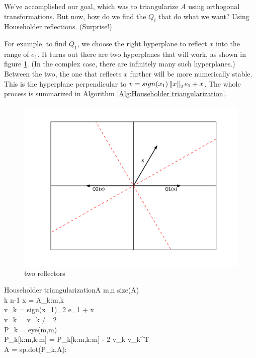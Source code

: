 We've accomplished our goal, which was to triangularize $A$ using orthogonal transformations. 
But now, how do we find the $Q_i$ that do what we want? Using Householder reflections. (Surprise!)

For example, to find $Q_1$, we choose the right hyperplane to reflect $x$ into the range of $e_1$.
It turns out there are two hyperplanes that will work, as shown in figure \ref{fig:two reflectors}. 
(In the complex case, there are infinitely many such hyperplanes.) 
Between the two, the one that reflects $x$ further will be more numerically stable. 
This is the hyperplane perpendicular to \textbf{$v = sign(x_1)\left\lVert x\right\rVert_2 e_1 + x$}. 
The whole process is summarized in Algorithm \ref{Alg:Householder triangularization}.

\begin{figure}
	\centering
	\includegraphics[width= \textwidth]{fig2}
	\caption{two reflectors}
	\label{fig:two reflectors}
\end{figure}

\begin{pseudo}{Householder triangularization}{A}
\label{Alg:Householder triangularization}
m,n \GETS size(A)\\
\FOR k  \TO n-1 \DO
\BEGIN
   x = A_{k:m,k}\\
   v_k = sign(x_1)_2 e_1 + x\\
   v_k = v_k / _2\\
   P_k = eye(m,m)\\
   P_k[k:m,k:m] = P_k[k:m,k:m] - 2 v_k v_k^T\\
   A = sp.dot(P_k,A);
\END
\end{pseudo}

